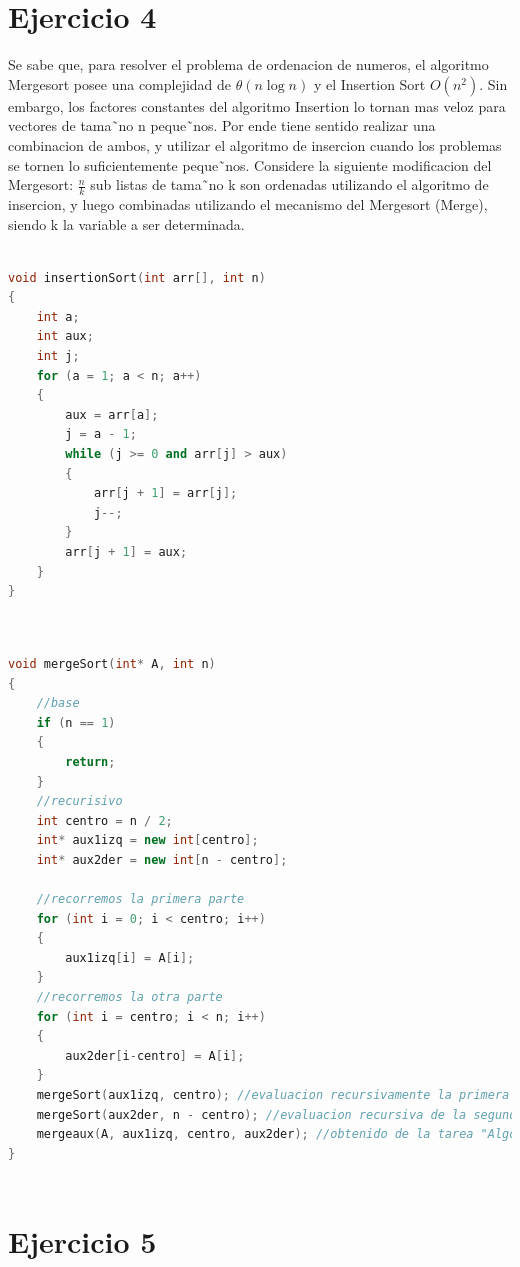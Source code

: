 \documentclass[10pt,a4paper]{article}
\begin{document}
\section{Ejercicio 4}
	Se sabe que, para resolver el problema de ordenacion de numeros, el algoritmo Mergesort posee una complejidad de $\theta(n \log{n})$ y el Insertion Sort $O(n^{2})$. Sin embargo, los factores constantes del algoritmo Insertion lo tornan mas veloz para vectores de tama˜no n peque˜nos. Por ende tiene sentido realizar
una combinacion de ambos, y utilizar el algoritmo de insercion cuando los problemas se tornen lo suficientemente peque˜nos. Considere la siguiente modificacion del Mergesort: $\frac{n}{k}$ sub listas de tama˜no k son ordenadas utilizando el algoritmo de insercion, y luego combinadas utilizando el mecanismo del
Mergesort (Merge), siendo k la variable a ser determinada.

	\begin{lstlisting}[language=C++, caption={InsertionSort.hpp}, label={lst:listing-cpp}, breaklines=true]
	
void insertionSort(int arr[], int n)
{
	int a;
	int aux;
	int j;
	for (a = 1; a < n; a++)
	{
		aux = arr[a];
		j = a - 1;
		while (j >= 0 and arr[j] > aux)
		{
			arr[j + 1] = arr[j];
			j--;
		}
		arr[j + 1] = aux;
	}
}	
	
	\end{lstlisting}
	
	\begin{lstlisting}[language=C++, caption={InsertionSort.hpp}, label={lst:listing-cpp}, breaklines=true]
	
void mergeSort(int* A, int n)
{
	//base
	if (n == 1)
	{
		return;
	}
	//recurisivo
	int centro = n / 2;
	int* aux1izq = new int[centro];
	int* aux2der = new int[n - centro];

	//recorremos la primera parte
	for (int i = 0; i < centro; i++)
	{
		aux1izq[i] = A[i];
	}
	//recorremos la otra parte
	for (int i = centro; i < n; i++)
	{
		aux2der[i-centro] = A[i];
	}
	mergeSort(aux1izq, centro); //evaluacion recursivamente la primera mitad
	mergeSort(aux2der, n - centro); //evaluacion recursiva de la segunda mitad
    mergeaux(A, aux1izq, centro, aux2der); //obtenido de la tarea "Algoritmos de ordenacion"
}
	
	\end{lstlisting}
\section{Ejercicio 5}
	
\end{document}
